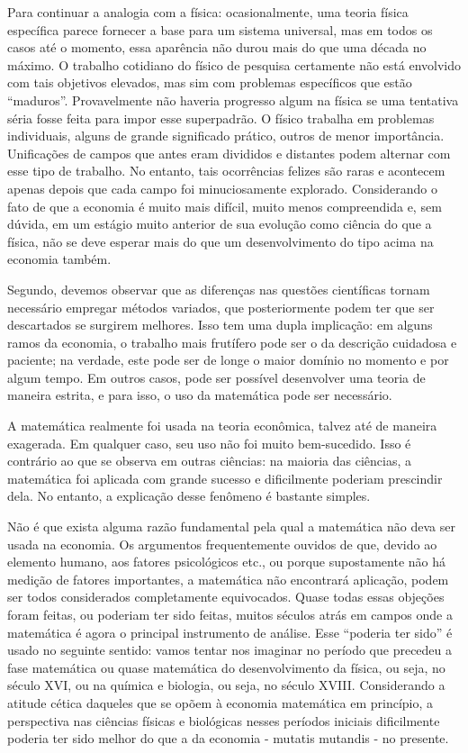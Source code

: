 \documentclass[12pt]{article}
\begin{document}
Para continuar a analogia com a física: ocasionalmente, uma teoria física específica parece fornecer a base para um sistema universal, mas em todos os casos até o momento, essa aparência não durou mais do que uma década no máximo. O trabalho cotidiano do físico de pesquisa certamente não está envolvido com tais objetivos elevados, mas sim com problemas específicos que estão “maduros”. Provavelmente não haveria progresso algum na física se uma tentativa séria fosse feita para impor esse superpadrão. O físico trabalha em problemas individuais, alguns de grande significado prático, outros de menor importância. Unificações de campos que antes eram divididos e distantes podem alternar com esse tipo de trabalho. No entanto, tais ocorrências felizes são raras e acontecem apenas depois que cada campo foi minuciosamente explorado. Considerando o fato de que a economia é muito mais difícil, muito menos compreendida e, sem dúvida, em um estágio muito anterior de sua evolução como ciência do que a física, não se deve esperar mais do que um desenvolvimento do tipo acima na economia também.

Segundo, devemos observar que as diferenças nas questões científicas tornam necessário empregar métodos variados, que posteriormente podem ter que ser descartados se surgirem melhores. Isso tem uma dupla implicação: em alguns ramos da economia, o trabalho mais frutífero pode ser o da descrição cuidadosa e paciente; na verdade, este pode ser de longe o maior domínio no momento e por algum tempo. Em outros casos, pode ser possível desenvolver uma teoria de maneira estrita, e para isso, o uso da matemática pode ser necessário.

A matemática realmente foi usada na teoria econômica, talvez até de maneira exagerada. Em qualquer caso, seu uso não foi muito bem-sucedido. Isso é contrário ao que se observa em outras ciências: na maioria das ciências, a matemática foi aplicada com grande sucesso e dificilmente poderiam prescindir dela. No entanto, a explicação desse fenômeno é bastante simples.

Não é que exista alguma razão fundamental pela qual a matemática não deva ser usada na economia. Os argumentos frequentemente ouvidos de que, devido ao elemento humano, aos fatores psicológicos etc., ou porque supostamente não há medição de fatores importantes, a matemática não encontrará aplicação, podem ser todos considerados completamente equivocados. Quase todas essas objeções foram feitas, ou poderiam ter sido feitas, muitos séculos atrás em campos onde a matemática é agora o principal instrumento de análise. Esse “poderia ter sido” é usado no seguinte sentido: vamos tentar nos imaginar no período que precedeu a fase matemática ou quase matemática do desenvolvimento da física, ou seja, no século XVI, ou na química e biologia, ou seja, no século XVIII. Considerando a atitude cética daqueles que se opõem à economia matemática em princípio, a perspectiva nas ciências físicas e biológicas nesses períodos iniciais dificilmente poderia ter sido melhor do que a da economia - mutatis mutandis - no presente.
\end{document}
